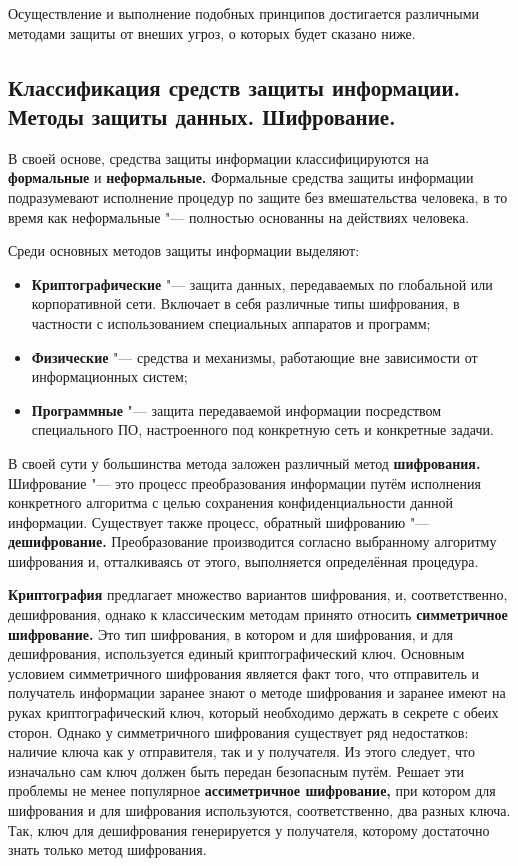 Осуществление и выполнение подобных принципов достигается различными методами защиты от внеших угроз, о которых будет сказано ниже.


\newpage
\subsection{Классификация средств защиты информации. Методы защиты данных. Шифрование.}
В своей основе, средства защиты информации классифицируются на \textbf{формальные} и \textbf{неформальные.} Формальные средства защиты информации подразумевают исполнение процедур по защите 
без вмешательства человека, в то время как неформальные "--- полностью основанны на действиях человека.

Среди основных методов защиты информации выделяют:
\begin{itemize}
    \item \textbf{Криптографические} "--- защита данных, передаваемых по глобальной или корпоративной сети. Включает в себя различные типы шифрования, в частности с использованием специальных аппаратов
    и программ;
    \item \textbf{Физические} "--- средства и механизмы, работающие вне зависимости от информационных систем;
    \item \textbf{Программные} "--- защита передаваемой информации посредством специального ПО, настроенного под конкретную сеть и конкретные задачи.
\end{itemize}

В своей сути у большинства метода заложен различный метод \textbf{шифрования.} Шифрование "--- это процесс преобразования информации путём исполнения конкретного алгоритма с целью сохранения конфиденциальности
данной информации. Существует также процесс, обратный шифрованию "--- \textbf{дешифрование.} Преобразование производится согласно выбранному алгоритму шифрования 
и, отталкиваясь от этого, выполняется определённая процедура.

\textbf{Криптография} предлагает множество вариантов шифрования, и, соответственно, дешифрования, однако к классическим методам принято относить \textbf{симметричное шифрование.} Это тип шифрования, в котором и для шифрования, и для дешифрования,
используется единый криптографический ключ. Основным условием симметричного шифрования является факт того, что отправитель и получатель информации заранее знают о 
методе шифрования и заранее имеют на руках криптографический ключ, который необходимо держать в секрете с обеих сторон. Однако у симметричного шифрования существует ряд недостатков: наличие ключа как у отправителя, так и у получателя.
Из этого следует, что изначально сам ключ должен быть передан безопасным путём. Решает эти проблемы не менее популярное \textbf{ассиметричное шифрование,} при котором для шифрования и для шифрования используются, соответственно, два разных ключа.
Так, ключ для дешифрования генерируется у получателя, которому достаточно знать только метод шифрования\cite{shifr}.






